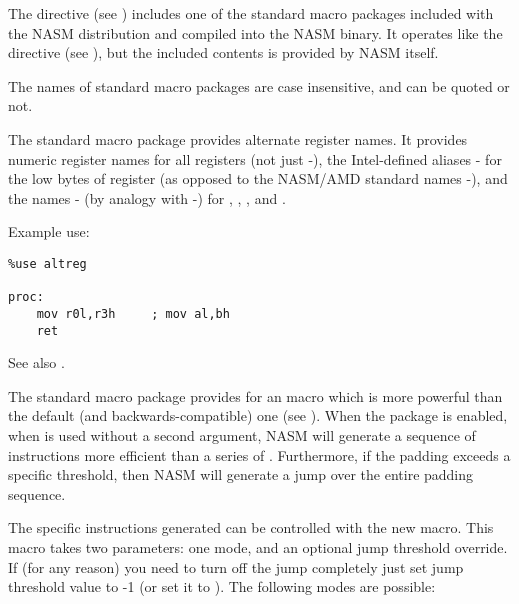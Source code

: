 
The  directive (see ) includes one of
the standard macro packages included with the NASM distribution and compiled
into the NASM binary. It operates like the  directive (see
), but the included contents is provided by NASM itself.

The names of standard macro packages are case insensitive, and can be
quoted or not.


The  standard macro package provides alternate register
names. It provides numeric register names for all registers (not just
-), the Intel-defined aliases -
for the low bytes of register (as opposed to the NASM/AMD standard names
-), and the names - (by analogy
with -) for , , ,
and .

Example use:

\begin{lstlisting}
%use altreg

proc:
    mov r0l,r3h     ; mov al,bh
    ret
\end{lstlisting}

See also .


The  standard macro package provides for an
 macro which is more powerful than the default (and
backwards-compatible) one (see ). When the
 package is enabled, when  is used without
a second argument, NASM will generate a sequence of instructions more
efficient than a series of . Furthermore, if the padding
exceeds a specific threshold, then NASM will generate a jump over
the entire padding sequence.

The specific instructions generated can be controlled with the
new  macro. This macro takes two parameters: one mode,
and an optional jump threshold override. If (for any reason) you need
to turn off the jump completely just set jump threshold value to -1
(or set it to ). The following modes are possible:

